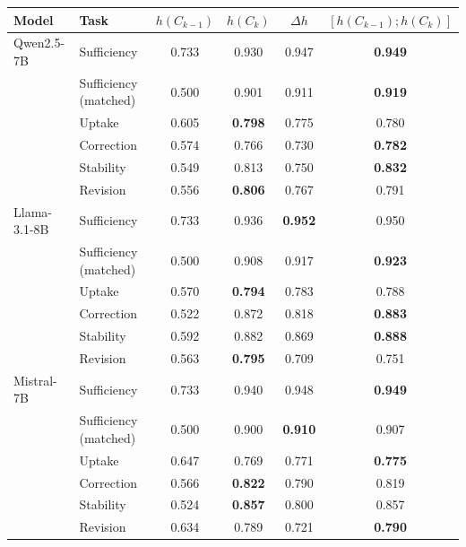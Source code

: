 \begin{tabular}{llcccc}
\toprule
Model & Task & $h(C_{k-1})$ & $h(C_k)$ & $\Delta h$ & $[h(C_{k-1});h(C_k)]$ \\
\midrule
Qwen2.5-7B & Sufficiency & 0.733 & 0.930 & 0.947 & \textbf{0.949} \\
 & Sufficiency (matched) & 0.500 & 0.901 & 0.911 & \textbf{0.919} \\
 & Uptake & 0.605 & \textbf{0.798} & 0.775 & 0.780 \\
 & Correction & 0.574 & 0.766 & 0.730 & \textbf{0.782} \\
 & Stability & 0.549 & 0.813 & 0.750 & \textbf{0.832} \\
 & Revision & 0.556 & \textbf{0.806} & 0.767 & 0.791 \\
\midrule
Llama-3.1-8B & Sufficiency & 0.733 & 0.936 & \textbf{0.952} & 0.950 \\
 & Sufficiency (matched) & 0.500 & 0.908 & 0.917 & \textbf{0.923} \\
 & Uptake & 0.570 & \textbf{0.794} & 0.783 & 0.788 \\
 & Correction & 0.522 & 0.872 & 0.818 & \textbf{0.883} \\
 & Stability & 0.592 & 0.882 & 0.869 & \textbf{0.888} \\
 & Revision & 0.563 & \textbf{0.795} & 0.709 & 0.751 \\
\midrule
Mistral-7B & Sufficiency & 0.733 & 0.940 & 0.948 & \textbf{0.949} \\
 & Sufficiency (matched) & 0.500 & 0.900 & \textbf{0.910} & 0.907 \\
 & Uptake & 0.647 & 0.769 & 0.771 & \textbf{0.775} \\
 & Correction & 0.566 & \textbf{0.822} & 0.790 & 0.819 \\
 & Stability & 0.524 & \textbf{0.857} & 0.800 & 0.857 \\
 & Revision & 0.634 & 0.789 & 0.721 & \textbf{0.790} \\
\bottomrule
\end{tabular}